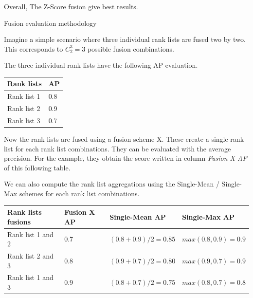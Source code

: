 Overall, The Z-Score fusion give best results.

\begin{example*}
  \caption{Fusion evaluation methodology}
  \label{ex:fusion_eval}

  Imagine a simple scenario where three individual rank lists are fused two by two.
  This corresponds to $C^3_2 = 3$ possible fusion combinations.

  The three individual rank lists have the following AP evaluation.

  \vspace{0.2cm}

  \begin{center}
    \begin{tabular}{l l}
      \toprule
      Rank lists & AP \\
      \midrule
      Rank list 1 & 0.8 \\
      Rank list 2 & 0.9 \\
      Rank list 3 & 0.7 \\
      \bottomrule
    \end{tabular}
  \end{center}

  \vspace{0.5cm}

  Now the rank lists are fused using a fusion scheme X.
  These create a single rank list for each rank list combinations.
  They can be evaluated with the average precision.
  For the example, they obtain the score written in column \textit{Fusion X AP} of this following table.

  We can also compute the rank list aggregations using the Single-Mean / Single-Max schemes for each rank list combinations.

  \vspace{0.2cm}

  \begin{center}
    \begin{tabular}{l|l l l}
      \toprule
      Rank lists fusions      & Fusion X AP   & Single-Mean AP   & Single-Max AP\\
      \midrule
      Rank list 1 and 2 & 0.7 & $(0.8 + 0.9) / 2 = 0.85$ & $max(0.8, 0.9) = 0.9$\\
      Rank list 2 and 3 & 0.8 & $(0.9 + 0.7) / 2 = 0.80$ & $max(0.9, 0.7) = 0.9$\\
      Rank list 1 and 3 & 0.9 & $(0.8 + 0.7) / 2 = 0.75$ & $max(0.8, 0.7) = 0.8$\\
      \bottomrule
    \end{tabular}
  \end{center}


\end{example*}
